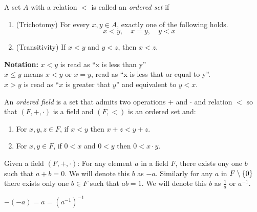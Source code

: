 \documentclass[12pt]{article}
\begin{document}
\begin{defn} \label{defn:order}
    A set $A$ with a relation $<$ is called an \emph{ordered set} if
    \begin{enumerate}[label=(O\arabic*)]
        \item \label{defn:order:trichotomy}
            (Trichotomy) For every $x, y \in A$, exactly one of the following holds. \[
                x < y, \quad x = y, \quad y < x
            \]
        \item \label{defn:order:transitivity}
            (Transitivity) If $x < y$ and $y < z$, then $x < z$.
        \setcounter{temp}{\value{enumi}}
    \end{enumerate}
    \textbf{Notation:} $x < y$ is read as ``x is less than y'' \\
    $x \leq y$ means $x < y$ or $x = y$, read as ``x is less that or equal to y''. \\
    $x > y$ is read as ``$x$ is greater that $y$'' and equivalent to $y < x$.
\end{defn}

\begin{defn} \label{defn:ordered field}
    An \emph{ordered field} is a set that admits two operations $+$ and $\cdot$ and relation $<$ so that $(F, +, \cdot)$ is a field and $(F, <)$ is an ordered set and:
    \begin{enumerate}[label=(O\arabic*)]
        \setcounter{enumi}{\value{temp}}
        \item \label{defn:order:sum}
            For $x, y, z \in F$, if $x < y$ then $x + z < y + z$.
        \item \label{defn:order:product}
            For $x, y \in F$, if $0 < x$ and $0 < y$ then $0 < x \cdot y$.
    \end{enumerate}
\end{defn}

\begin{lem} \label{thm:field:unique_inverses}
    Given a field $(F, +, \cdot)$: For any element $a$ in a field $F$, there exists ony one $b$ such that $a + b = 0$. We will denote this $b$ as $-a$. Similarly for any $a$ in $F \setminus \set{0}$ there exists only one $b \in F$ such that $ab = 1$. We will denote this $b$ as $\frac{1}{a}$ or $a^{-1}$.
\end{lem}

\begin{lem} \label{thm:field:inverse_involution}
    $-(-a) = a = (a^{-1})^{-1}$
\end{lem}
\end{document}
